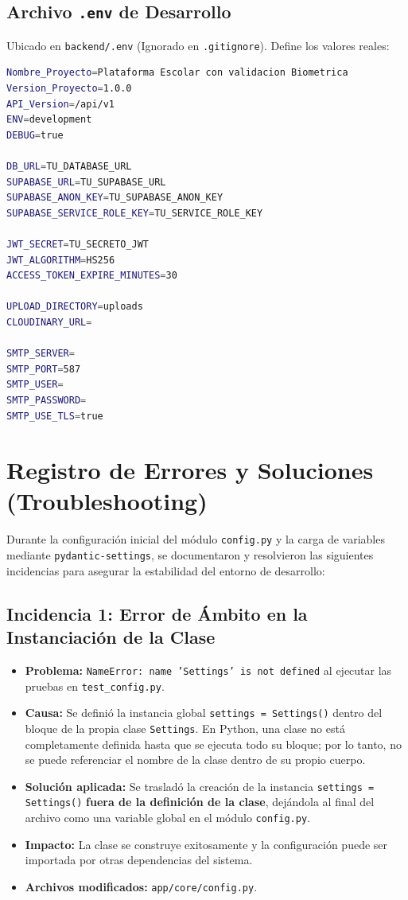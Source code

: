 \documentclass[12pt,a4paper]{article}
\begin{document}
\subsection{Archivo \texttt{.env} de Desarrollo}
Ubicado en \texttt{backend/.env} (Ignorado en \texttt{.gitignore}). Define los valores reales:

\begin{lstlisting}[language=bash, caption=backend/.env]
Nombre_Proyecto=Plataforma Escolar con validacion Biometrica
Version_Proyecto=1.0.0
API_Version=/api/v1
ENV=development
DEBUG=true

DB_URL=TU_DATABASE_URL
SUPABASE_URL=TU_SUPABASE_URL
SUPABASE_ANON_KEY=TU_SUPABASE_ANON_KEY
SUPABASE_SERVICE_ROLE_KEY=TU_SERVICE_ROLE_KEY

JWT_SECRET=TU_SECRETO_JWT
JWT_ALGORITHM=HS256
ACCESS_TOKEN_EXPIRE_MINUTES=30

UPLOAD_DIRECTORY=uploads
CLOUDINARY_URL=

SMTP_SERVER=
SMTP_PORT=587
SMTP_USER=
SMTP_PASSWORD=
SMTP_USE_TLS=true
\end{lstlisting}

\section{Registro de Errores y Soluciones (Troubleshooting)}

Durante la configuración inicial del módulo \texttt{config.py} y la carga de variables mediante \texttt{pydantic-settings}, se documentaron y resolvieron las siguientes incidencias para asegurar la estabilidad del entorno de desarrollo:

\subsection{Incidencia 1: Error de Ámbito en la Instanciación de la Clase}
\begin{itemize}
    \item \textbf{Problema:} \texttt{NameError: name 'Settings' is not defined} al ejecutar las pruebas en \texttt{test\_config.py}.
    \item \textbf{Causa:} Se definió la instancia global \texttt{settings = Settings()} dentro del bloque de la propia clase \texttt{Settings}. En Python, una clase no está completamente definida hasta que se ejecuta todo su bloque; por lo tanto, no se puede referenciar el nombre de la clase dentro de su propio cuerpo.
    \item \textbf{Solución aplicada:} Se trasladó la creación de la instancia \texttt{settings = Settings()} \textbf{fuera de la definición de la clase}, dejándola al final del archivo como una variable global en el módulo \texttt{config.py}.
    \item \textbf{Impacto:} La clase se construye exitosamente y la configuración puede ser importada por otras dependencias del sistema.
    \item \textbf{Archivos modificados:} \texttt{app/core/config.py}.
\end{itemize}
\end{document}
